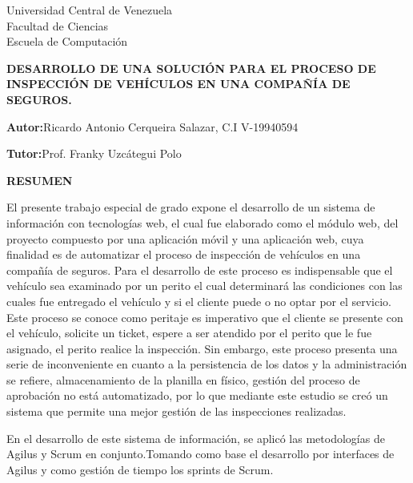 
\begin{center}
	Universidad Central de Venezuela\\
	Facultad de Ciencias\\
	Escuela de Computación\\
	
\end{center}

\begin{center}
	\textbf{ DESARROLLO DE UNA SOLUCIÓN PARA EL PROCESO DE INSPECCIÓN DE VEHÍCULOS EN UNA COMPAÑÍA DE SEGUROS. }
\end{center}

\begin{flushright}
\textbf{Autor:}Ricardo Antonio Cerqueira Salazar, C.I V-19940594
\end{flushright}

\begin{flushright}
\textbf{Tutor:}Prof. Franky Uzcátegui Polo
\end{flushright}


\begin{center}
	\large{\textbf{RESUMEN}}
\end{center}

\justify

El presente trabajo especial de grado expone el desarrollo de un sistema de información con tecnologías web, el cual fue elaborado como el módulo web, del proyecto compuesto por una aplicación móvil y una aplicación web, cuya finalidad es de automatizar el proceso de inspección de vehículos en una compañía de seguros. Para el desarrollo de este proceso es indispensable que el vehículo sea examinado por un perito el cual determinará las condiciones con las cuales fue entregado el vehículo y si el cliente puede o no optar por el servicio. Este proceso se conoce como peritaje es imperativo que el cliente se presente con el vehículo, solicite un ticket, espere a ser atendido por el perito que le fue asignado, el perito realice la inspección. Sin embargo, este proceso presenta una serie de inconveniente en cuanto a la persistencia de los datos y la administración se refiere, almacenamiento de la planilla en físico, gestión del proceso de aprobación no está automatizado, por lo que mediante este estudio se creó un sistema que permite una mejor gestión de las inspecciones realizadas.

En el desarrollo de este sistema de información, se aplicó las metodologías de Agilus y Scrum en conjunto.Tomando como base el desarrollo por interfaces de Agilus y como gestión de tiempo los sprints de Scrum.


